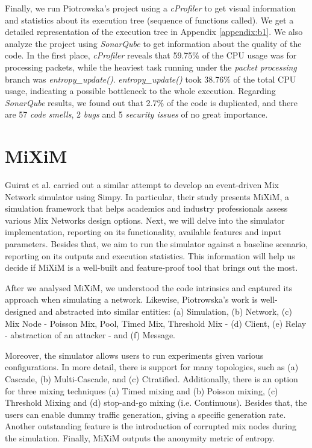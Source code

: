 \documentclass[logo,msc,cyber]{infthesis}   %
\begin{document}
Finally, we run Piotrowska's project using a \emph{cProfiler}\cite{cProfile} to
get visual information and statistics about its execution tree (sequence of
functions called). We get a detailed representation of the execution tree in
Appendix \ref{appendix:b1}. We also analyze the project using \emph{SonarQube}\cite{sonarqube} to
get information about the quality of the code. In the first place,
\emph{cProfiler} reveals that 59.75\% of the CPU usage was for processing
packets, while the heaviest task running under the \emph{packet processing}
branch was \emph{entropy\_update()}. \emph{entropy\_update()} took 38.76\% of
the total CPU usage, indicating a possible bottleneck to the whole execution.
Regarding \emph{SonarQube} results, we found out that 2.7\% of the code is
duplicated, and there are 57 \emph{code smells}, 2 \emph{bugs} and 5
\emph{security issues} of no great importance.

\section{MiXiM}

Guirat et al.\cite{guirat2022mixnet} carried out a similar attempt to develop an
event-driven Mix Network simulator using Simpy\cite{simpy}. In particular,
their study\cite{guirat2022mixnet} presents MiXiM, a simulation framework that
helps academics and industry professionals assess various Mix Networks design
options. Next, we will delve into the simulator implementation, reporting on its
functionality, available features and input parameters. Besides that, we aim to
run the simulator against a baseline scenario, reporting on its outputs and
execution statistics. This information will help us decide if MiXiM is a
well-built and feature-proof tool that brings out the most.

After we analysed  MiXiM, we understood the code intrinsics and captured its
approach when simulating a network. Likewise, Piotrowska's work is well-designed
and abstracted into similar entities: (a) Simulation, (b) Network, (c) Mix Node -
Poisson Mix, Pool, Timed Mix, Threshold Mix - (d) Client, (e) Relay -
abstraction of an attacker - and (f) Message.


Moreover, the simulator allows users to run experiments given various
configurations. In more detail, there is support for many topologies, such as
(a) Cascade, (b) Multi-Cascade, and (c) Ctratified. Additionally, there is an
option for three mixing techniques (a) Timed mixing and (b) Poisson mixing, (c)
Threshold Mixing and (d) stop-and-go mixing\cite{kesdogan1998stop} (i.e.
Continuous). Besides that, the users can enable dummy traffic generation, giving
a specific generation rate. Another outstanding feature is the introduction of
corrupted mix nodes during the simulation. Finally, MiXiM outputs the
anonymity metric of entropy.
\end{document}
